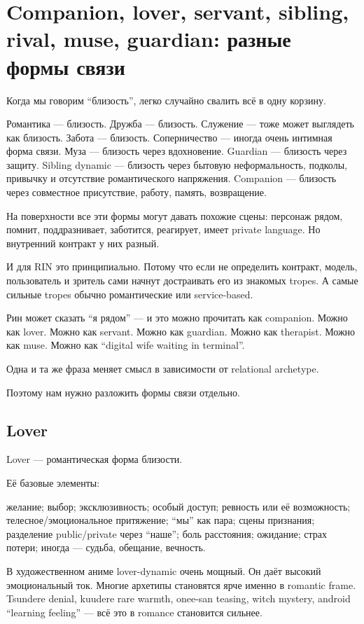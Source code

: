 \section{Companion, lover, servant, sibling, rival, muse, guardian: разные формы связи}

Когда мы говорим ``близость'', легко случайно свалить всё в одну
корзину.

Романтика --- близость. Дружба --- близость. Служение --- тоже может
выглядеть как близость. Забота --- близость. Соперничество --- иногда
очень интимная форма связи. Муза --- близость через вдохновение.
Guardian --- близость через защиту. Sibling dynamic --- близость через
бытовую неформальность, подколы, привычку и отсутствие романтического
напряжения. Companion --- близость через совместное присутствие, работу,
память, возвращение.

На поверхности все эти формы могут давать похожие сцены: персонаж рядом,
помнит, поддразнивает, заботится, реагирует, имеет private language. Но
внутренний контракт у них разный.

И для RIN это принципиально. Потому что если не определить контракт,
модель, пользователь и зритель сами начнут достраивать его из знакомых
tropes. А самые сильные tropes обычно романтические или service-based.

Рин может сказать ``я рядом'' --- и это можно прочитать как companion.
Можно как lover. Можно как servant. Можно как guardian. Можно как
therapist. Можно как muse. Можно как ``digital wife waiting in
terminal''.

Одна и та же фраза меняет смысл в зависимости от relational archetype.

Поэтому нам нужно разложить формы связи отдельно.

\subsection*{Lover}

Lover --- романтическая форма близости.

Её базовые элементы:

желание; выбор; эксклюзивность; особый доступ; ревность или её
возможность; телесное/\hspace{0pt}эмоциональное притяжение; ``мы'' как пара; сцены
признания; разделение public/\hspace{0pt}private через ``наше''; боль расстояния;
ожидание; страх потери; иногда --- судьба, обещание, вечность.

В художественном аниме lover-dynamic очень мощный. Он даёт высокий
эмоциональный ток. Многие архетипы становятся ярче именно в romantic
frame. Tsundere denial, kuudere rare warmth, onee-san teasing, witch
mystery, android ``learning feeling'' --- всё это в romance становится
сильнее.

